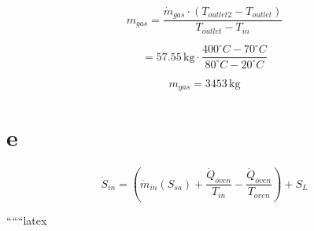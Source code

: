 \begin{equation*}
m_{gas} = \frac{\dot{m}_{gas} \cdot (T_{outlet2} - T_{outlet})}{T_{outlet} - T_{in}}
\end{equation*}

\begin{equation*}
= 57.55 \, \text{kg} \cdot \frac{400^\circ C - 70^\circ C}{80^\circ C - 20^\circ C}
\end{equation*}

\begin{equation*}
m_{gas} = 3453 \, \text{kg}
\end{equation*}

\section*{e}
\begin{equation*}
\dot{S}_{in} = (\dot{m}_{in} (S_{sa}) + \frac{\dot{Q}_{oven}}{T_{in}} - \frac{\dot{Q}_{oven}}{T_{oven}}) + S_{L}
\end{equation*}

``````latex


